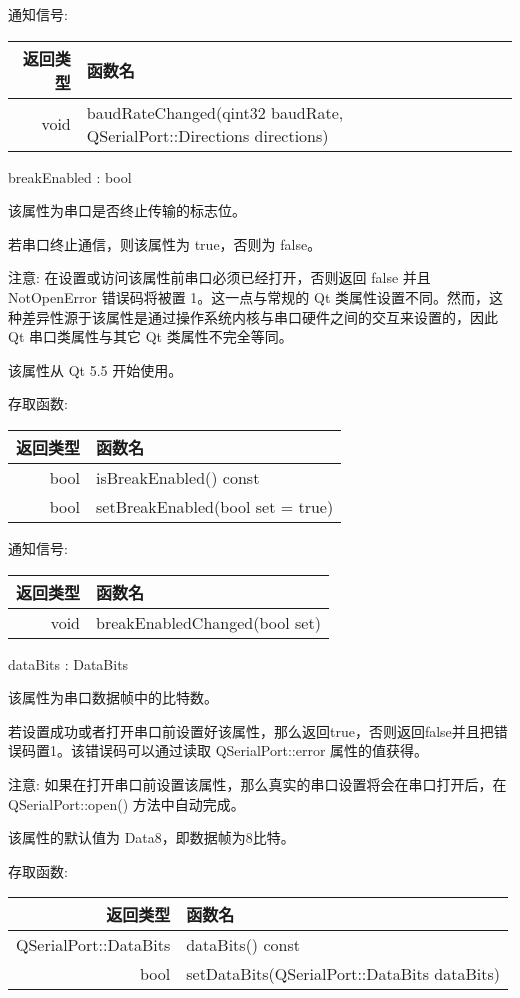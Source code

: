 通知信号:

\begin{tabular}{|r|m{25em}|}
\hline
返回类型 &	函数名 \\
\hline
void 	& baudRateChanged(qint32 baudRate, QSerialPort::Directions directions) \\ 
\hline
\end{tabular} 

breakEnabled : bool

该属性为串口是否终止传输的标志位。

若串口终止通信，则该属性为 true，否则为 false。

注意: 在设置或访问该属性前串口必须已经打开，否则返回 false 并且 NotOpenError 错误码将被置 1。这一点与常规的 Qt 类属性设置不同。然而，这种差异性源于该属性是通过操作系统内核与串口硬件之间的交互来设置的，因此 Qt 串口类属性与其它 Qt 类属性不完全等同。

该属性从 Qt 5.5 开始使用。

存取函数:

\begin{tabular}{|r|l|}
\hline
返回类型 	& 函数名 \\ 
\hline 
bool 	&isBreakEnabled() const \\ 
\hline
bool &	setBreakEnabled(bool set = true) \\ 
\hline
\end{tabular}



通知信号:

\begin{tabular}{|r|l|}
\hline
返回类型  &	函数名 \\ 
\hline
void &	breakEnabledChanged(bool set) \\ 
\hline
\end{tabular}

dataBits : DataBits 

该属性为串口数据帧中的比特数。

若设置成功或者打开串口前设置好该属性，那么返回true，否则返回false并且把错误码置1。该错误码可以通过读取 QSerialPort::error 属性的值获得。

注意: 如果在打开串口前设置该属性，那么真实的串口设置将会在串口打开后，在 QSerialPort::open() 方法中自动完成。

该属性的默认值为 Data8，即数据帧为8比特。

存取函数:

\begin{tabular}{|r|l|}
\hline
返回类型  &	函数名 \\ 
\hline
QSerialPort::DataBits  &	dataBits() const \\
\hline
bool &	setDataBits(QSerialPort::DataBits dataBits) \\ 
\hline
\end{tabular}


